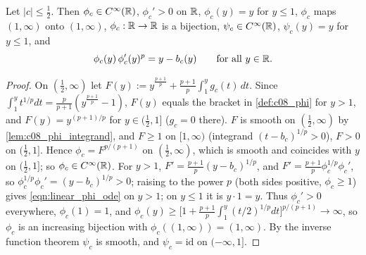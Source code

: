 \begin{lemma}
  \label{lem:c08_phi_diffeo}
  Let $|c|\le\frac12$. Then $\phi_c\in C^\infty(\mathbb{R})$, $\phi_c'>0$ on $\mathbb{R}$, $\phi_c(y)=y$ for $y\le1$,
  $\phi_c$ maps $(1,\infty)$ onto $(1,\infty)$, $\phi_c:\mathbb{R}\to\mathbb{R}$ is a bijection, $\psi_c\in C^\infty(\mathbb{R})$,
  $\psi_c(y)=y$ for $y\le1$, and
  \begin{equation}\label{eqn:linear_phi_ode}
    \phi_c(y)\,\phi_c'(y)^p=y-b_c(y)\qquad\text{for all }y\in\mathbb{R}.
  \end{equation}
\end{lemma}
\begin{proof}
  On $(\frac12,\infty)$ let $F(y):=y^{\frac{p+1}p}+\frac{p+1}p\int_1^yg_c(t)\,dt$. Since
  $\int_1^yt^{1/p}dt=\frac p{p+1}(y^{\frac{p+1}p}-1)$, $F(y)$ equals the bracket in \cref{def:c08_phi} for
  $y>1$, and $F(y)=y^{(p+1)/p}$ for $y\in(\frac12,1]$ ($g_c=0$ there). $F$ is smooth on $(\frac12,\infty)$
  by \cref{lem:c08_phi_integrand}, and $F\ge1$ on $[1,\infty)$ (integrand $(t-b_c)^{1/p}>0$), $F>0$ on
  $(\frac12,1]$. Hence $\phi_c=F^{p/(p+1)}$ on $(\frac12,\infty)$, which is smooth and coincides with $y$
  on $(\frac12,1]$; so $\phi_c\in C^\infty(\mathbb{R})$. For $y>1$, $F'=\frac{p+1}p(y-b_c)^{1/p}$, and
  $F'=\frac{p+1}{p}\phi_c^{1/p}\phi_c'$, so $\phi_c^{1/p}\phi_c'=(y-b_c)^{1/p}>0$; raising to the power $p$
  (both sides positive, $\phi_c\ge1$) gives \eqref{eqn:linear_phi_ode} on $y>1$; on $y\le1$ it is
  $y\cdot1=y$. Thus $\phi_c'>0$ everywhere, $\phi_c(1)=1$, and $\phi_c(y)\ge\bigl[1+\frac{p+1}p\int_1^y(t/2)^{1/p}dt\bigr]^{p/(p+1)}\to\infty$,
  so $\phi_c$ is an increasing bijection with $\phi_c((1,\infty))=(1,\infty)$. By the inverse function
  theorem $\psi_c$ is smooth, and $\psi_c=\mathrm{id}$ on $(-\infty,1]$.
\end{proof}

